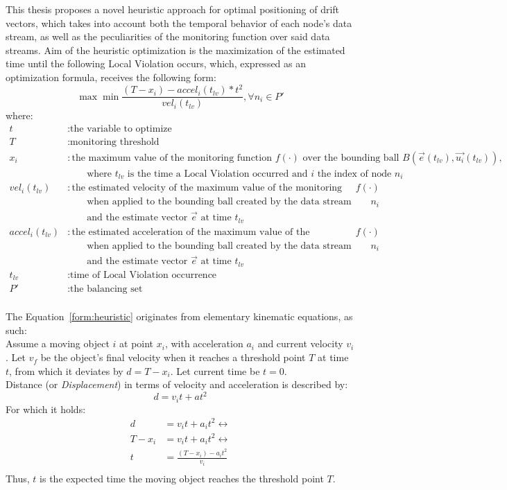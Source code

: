 This thesis proposes a novel heuristic approach for optimal positioning of drift vectors, which takes into account both the temporal behavior of each node's data stream, as well as the peculiarities of the monitoring function over said data streams. Aim of the heuristic optimization is the maximization of the estimated time until the following Local Violation occurs, which, expressed as an optimization formula, receives the following form:
\begin{equation}
\max\min \frac{(T-x_i)-accel_i(t_{lv})*t^2}{vel_i(t_{lv})}, \forall n_i \in P'
\label{form:heuristic}
\end{equation}
where:
\begin{align*}
t&:\text{the variable to optimize}\\
T&:\text{monitoring threshold}\\
x_i&:\text{the maximum value of the monitoring function $f(\cdot)$ over the bounding ball $B(\vec{e}(t_{lv}), \vec{u_i}(t_{lv}))$,}\\&\qquad\text{where $t_{lv}$ is the time a Local Violation occurred and $i$ the index of node $n_i$}\\
vel_i(t_{lv})&:\text{the estimated velocity of the maximum value of the monitoring function $f(\cdot)$}\\&\qquad\text{when applied to the bounding ball created by the data stream update of node $n_i$}\\&\qquad\text{and the estimate vector $\vec{e}$ at time $t_{lv}$}\\
accel_i(t_{lv})&:\text{the estimated acceleration of the maximum value of the monitoring function $f(\cdot)$}\\&\qquad\text{when applied to the bounding ball created by the data stream update of node $n_i$}\\&\qquad\text{and the estimate vector $\vec{e}$ at time $t_{lv}$}\\
t_{lv}&:\text{time of Local Violation occurrence}\\
P'&:\text{the balancing set}\\
\end{align*}

The Equation~\ref{form:heuristic} originates from elementary kinematic equations, as such:\\
Assume a moving object $i$ at point $x_i$, with acceleration $a_i$ and current velocity $v_i$. Let $v_f$ be the object's final velocity when it reaches a threshold point $T$ at time $t$, from which it deviates by $d=T-x_i$. Let current time be $t=0$.\\
Distance (or \emph{Displacement}) in terms of velocity and acceleration is described by:
\begin{equation}
d=v_i t+a t^2
\label{form:displacement}
\end{equation}
For which it holds:
\begin{align*}
d&=v_i t+a_i t^2 \leftrightarrow\\
T-x_i&=v_i t + a_i t^2 \leftrightarrow\\
t&=\frac{(T-x_i)-a_i t^2}{v_i}\\
\end{align*}
Thus, $t$ is the expected time the moving object reaches the threshold point $T$.

